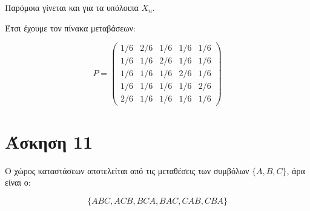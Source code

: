 \documentclass[11pt,a4paper]{article}
\begin{document}
Παρόμοια γίνεται και για τα υπόλοιπα $X_n$.

Έτσι έχουμε τον πίνακα μεταβάσεων:


\begin{equation*}
    P = 
    \begin{pmatrix}
        1/6 & 2/6 & 1/6 & 1/6 & 1/6 \\
        1/6 & 1/6 & 2/6 & 1/6 & 1/6 \\
        1/6 & 1/6 & 1/6 & 2/6 & 1/6 \\
        1/6 & 1/6 & 1/6 & 1/6 & 2/6 \\
        2/6 & 1/6 & 1/6 & 1/6 & 1/6
    \end{pmatrix}
\end{equation*}

\section*{Άσκηση 11}

Ο χώρος καταστάσεων αποτελείται από τις μεταθέσεις των συμβόλων $\{A, B, C\}$, άρα είναι ο:

$$
    \{ABC, ACB, BCA, BAC, CAB, CBA\}
$$
\end{document}
